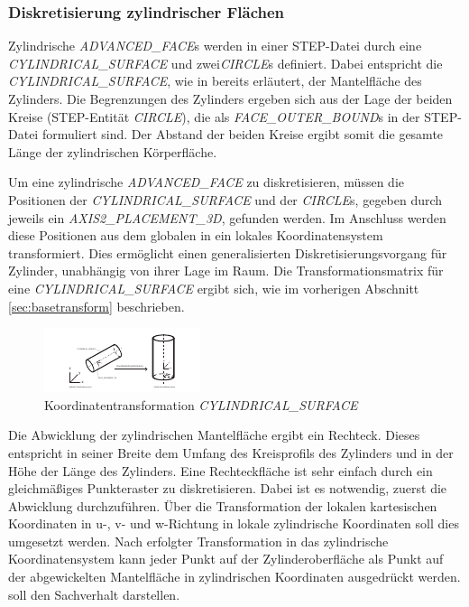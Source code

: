 \subsubsection{Diskretisierung zylindrischer Flächen}

Zylindrische \textit{ADVANCED\_FACE}s werden in einer STEP-Datei durch eine \textit{CYLINDRICAL\_SURFACE} und zwei\textit{CIRCLE}s definiert. Dabei entspricht die \textit{CYLINDRICAL\_SURFACE}, wie in  bereits erläutert, der Mantelfläche des Zylinders. Die Begrenzungen des Zylinders ergeben sich aus der Lage der beiden Kreise (STEP-Entität \textit{CIRCLE}), die als \textit{FACE\_\-OUTER\_\-BOUND}s in der STEP-Datei formuliert sind. Der Abstand der beiden Kreise ergibt somit die gesamte Länge der zylindrischen Körperfläche.

Um eine zylindrische \textit{ADVANCED\_FACE} zu diskretisieren, müssen die Positionen der \textit{CYLINDRICAL\_SURFACE} und der \textit{CIRCLE}s, gegeben durch jeweils ein \textit{AXIS2\_PLACEMENT\_3D}, gefunden werden. Im Anschluss werden diese Positionen aus dem globalen in ein lokales Koordinatensystem transformiert. Dies ermöglicht einen generalisierten Diskretisierungsvorgang für Zylinder, unabhängig von ihrer Lage im Raum. Die Transformationsmatrix für eine \textit{CYLINDRICAL\_SURFACE} ergibt sich, wie im vorherigen Abschnitt \ref{sec:basetransform} beschrieben.  

\begin{figure}[h]
	\centering
	
	\includegraphics[width=\linewidth]{img/trafozylinder.pdf}
	
	\caption{Koordinatentransformation \textit{CYLINDRICAL\_SURFACE}}
	\label{fig:trafozylinder}
	
\end{figure}

Die Abwicklung der zylindrischen Mantelfläche ergibt ein Rechteck. Dieses entspricht in seiner Breite dem Umfang des Kreisprofils des Zylinders und in der Höhe der Länge des Zylinders. Eine Rechteckfläche ist sehr einfach durch ein gleichmäßiges Punkteraster zu diskretisieren. Dabei ist es notwendig, zuerst die Abwicklung durchzuführen. Über die Transformation der lokalen kartesischen Koordinaten in u-, v- und w-Richtung in lokale zylindrische Koordinaten soll dies umgesetzt werden. Nach erfolgter Transformation in das zylindrische Koordinatensystem kann jeder Punkt auf der Zylinderoberfläche als Punkt auf der abgewickelten Mantelfläche in zylindrischen Koordinaten ausgedrückt werden.  soll den Sachverhalt darstellen. 


